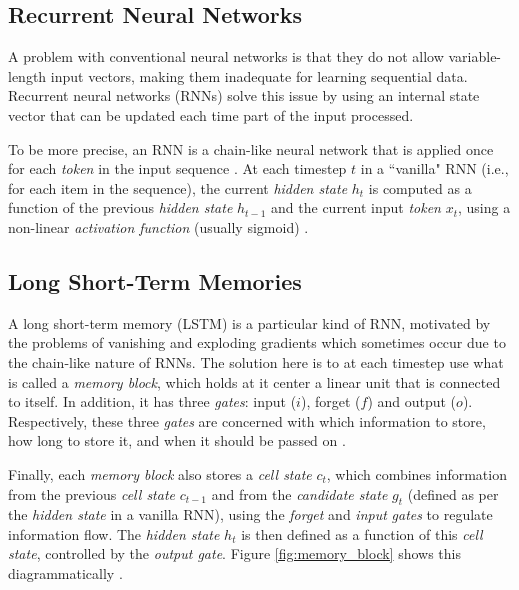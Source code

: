 \subsection{Recurrent Neural Networks}

A problem with conventional neural networks is that they do not allow variable-length input vectors, making them inadequate for learning sequential data. Recurrent neural networks (RNNs) solve this issue by using an internal state vector that can be updated each time part of the input processed.

To be more precise, an RNN is a chain-like neural network that is applied once for each \textit{token} in the input sequence \cite{cho_learning_2014}. At each timestep $t$ in a ``vanilla" RNN (i.e., for each item in the sequence), the current \textit{hidden state} $h_t$ is computed as a function of the previous \textit{hidden state} $h_{t-1}$ and the current input \textit{token} $x_t$, using a non-linear \textit{activation function} (usually sigmoid) \cite{cho_learning_2014}.

\subsection{Long Short-Term Memories}

A long short-term memory (LSTM) is a particular kind of RNN, motivated by the problems of vanishing and exploding gradients which sometimes occur due to the chain-like nature of RNNs. The solution here is to at each timestep use what is called a \textit{memory block}, which holds at it center a linear unit that is connected to itself. In addition, it has three \textit{gates}: input ($i$), forget ($f$) and output ($o$). Respectively, these three \textit{gates} are concerned with which information to store, how long to store it, and when it should be passed on \cite{gers_learning_2000}.

Finally, each \textit{memory block} also stores a \textit{cell state} $c_t$, which combines information from the previous \textit{cell state} $c_{t-1}$ and from the \textit{candidate state} $g_t$ (defined as per the \textit{hidden state} in a vanilla RNN), using the \textit{forget} and \textit{input} \textit{gates} to regulate information flow. The \textit{hidden state} $h_t$ is then defined as a function of this \textit{cell state}, controlled by the \textit{output gate}. Figure \ref{fig:memory_block} shows this diagrammatically \cite{graves_hybrid_2013}.

